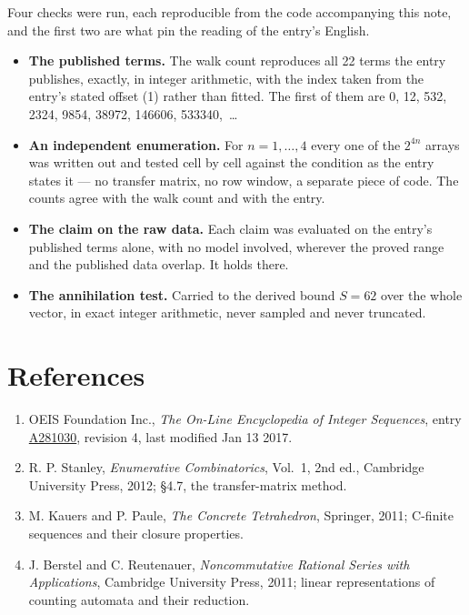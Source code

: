 \documentclass[11pt]{article}
\theoremstyle{definition}
\begin{document}
Four checks were run, each reproducible from the code accompanying this note, and the first two are what pin the reading of the entry's English.

\begin{itemize}

\item {\bfseries The published terms.} The walk count reproduces all 22 terms the entry publishes, exactly, in integer arithmetic, with the index taken from the entry's stated offset (1) rather than fitted. The first of them are 0, 12, 532, 2324, 9854, 38972, 146606, 533340,~\dots

\item {\bfseries An independent enumeration.} For $n = 1,\dots,4$ every one of the $2^{4n}$ arrays was written out and tested cell by cell against the condition as the entry states it --- no transfer matrix, no row window, a separate piece of code. The counts agree with the walk count and with the entry.

\item {\bfseries The claim on the raw data.} Each claim was evaluated on the entry's published terms alone, with no model involved, wherever the proved range and the published data overlap. It holds there.

\item {\bfseries The annihilation test.} Carried to the derived bound $S = 62$ over the whole vector, in exact integer arithmetic, never sampled and never truncated.

\end{itemize}

\section{References}

\begin{enumerate}

\item OEIS Foundation Inc., \emph{The On-Line Encyclopedia of Integer Sequences}, entry \href{https://oeis.org/A281030}{A281030}, revision 4, last modified Jan 13 2017.

\item R. P. Stanley, \emph{Enumerative Combinatorics}, Vol.~1, 2nd ed., Cambridge University Press, 2012; \S4.7, the transfer-matrix method.

\item M. Kauers and P. Paule, \emph{The Concrete Tetrahedron}, Springer, 2011; C-finite sequences and their closure properties.

\item J. Berstel and C. Reutenauer, \emph{Noncommutative Rational Series with Applications}, Cambridge University Press, 2011; linear representations of counting automata and their reduction.

\end{enumerate}
\end{document}

